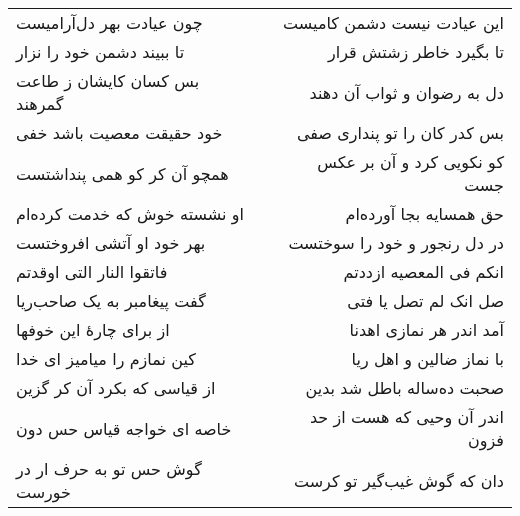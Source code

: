 \begin{center}
\begin{longtable}{l p{0.5cm} r}
چون عیادت بهر دل‌آرامیست
&&
این عیادت نیست دشمن کامیست
\\
تا ببیند دشمن خود را نزار
&&
تا بگیرد خاطر زشتش قرار
\\
بس کسان کایشان ز طاعت گمرهند
&&
دل به رضوان و ثواب آن دهند
\\
خود حقیقت معصیت باشد خفی
&&
بس کدر کان را تو پنداری صفی
\\
همچو آن کر کو همی پنداشتست
&&
کو نکویی کرد و آن بر عکس جست
\\
او نشسته خوش که خدمت کرده‌ام
&&
حق همسایه بجا آورده‌ام
\\
بهر خود او آتشی افروختست
&&
در دل رنجور و خود را سوختست
\\
فاتقوا النار التی اوقدتم
&&
انکم فی المعصیه ازددتم
\\
گفت پیغامبر به یک صاحب‌ریا
&&
صل انک لم تصل یا فتی
\\
از برای چارهٔ این خوفها
&&
آمد اندر هر نمازی اهدنا
\\
کین نمازم را میامیز ای خدا
&&
با نماز ضالین و اهل ریا
\\
از قیاسی که بکرد آن کر گزین
&&
صحبت ده‌ساله باطل شد بدین
\\
خاصه ای خواجه قیاس حس دون
&&
اندر آن وحیی که هست از حد فزون
\\
گوش حس تو به حرف ار در خورست
&&
دان که گوش غیب‌گیر تو کرست
\\
\end{longtable}
\end{center}
